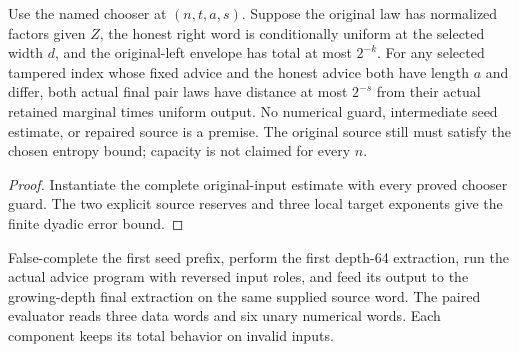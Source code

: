 \begin{theorem}
  \label{thm:lowerbounds-algebraic-affine-phase-one-selected}
  \leanok
  Use the named chooser at $(n,t,a,s)$. Suppose the original law has
  normalized factors given $Z$, the honest right word is conditionally
  uniform at the selected width $d$, and the original-left envelope
  has total at most $2^{-k}$. For any selected tampered index whose
  fixed advice and the honest advice both have length $a$ and differ,
  both actual final pair laws have distance at most $2^{-s}$ from
  their actual retained marginal times uniform output.
  No numerical guard, intermediate seed estimate, or repaired source
  is a premise. The original source still must satisfy the chosen
  entropy bound; capacity is not claimed for every $n$.
\end{theorem}
\begin{proof}
  \leanok
  Instantiate the complete original-input estimate with every proved
  chooser guard. The two explicit source reserves and three local
  target exponents give the finite dyadic error bound.
\end{proof}

\begin{definition}
  \label{def:lowerbounds-algebraic-affine-phase-one-program}
  \leanok
  False-complete the first seed prefix, perform the first depth-64
  extraction, run the actual advice program with reversed input roles,
  and feed its output to the growing-depth final extraction on the
  same supplied source word. The paired evaluator reads three data words and
  six unary numerical words. Each component keeps its total behavior
  on invalid inputs.
\end{definition}

